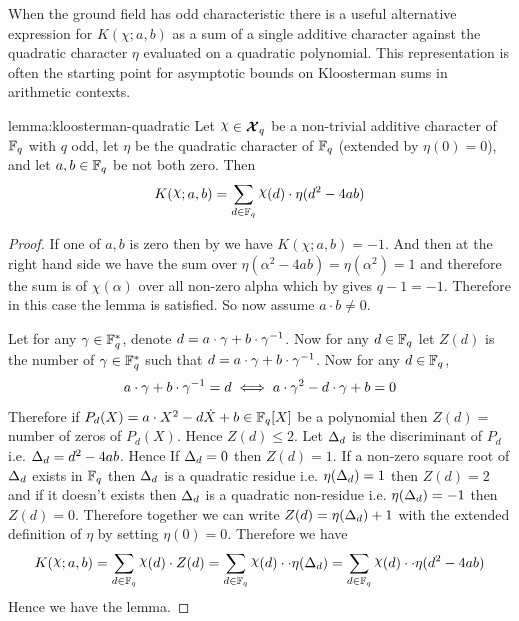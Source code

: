 When the ground field has odd characteristic there is a useful alternative expression for $K(\chi;a,b)$ as a sum of a single additive character against the quadratic character $\eta$ evaluated on a quadratic polynomial. This representation is often the starting point for asymptotic bounds on Kloosterman sums in arithmetic contexts.
\begin{lemma}{}{lemma:kloosterman-quadratic}
  Let $\chi\in\Xq$ be a non-trivial additive character of $\mathbb{F}_q$ with $q$ odd, let $\eta$ be the quadratic character of $\mathbb{F}_q$ (extended by $\eta(0)=0$), and let $a,b\in\mathbb{F}_q$ be not both zero. Then $$K(\chi;a,b)=\sum_{d\in\bbF_q}\chi(d)\cdot \eta(d^2-4ab)$$
\end{lemma}
\begin{proof}
  If one of $a,b$ is zero then by  we have $K(\chi;a,b)=-1$. And then at the right hand side we have the sum over $\eta(\alpha^2-4ab)=\eta(\alpha^2)=1$ and therefore the sum is of $\chi(\alpha)$ over all non-zero alpha which by \AddCharPropsthm[(i)] gives $q-1=-1$. Therefore in this case the lemma is satisfied. So now assume $a\cdot b\neq 0$. 

  Let for any $\gamma\in\mathbb{F}_q^*$, denote $d=a\cdot \gamma+b\cdot \gamma^{-1}$. Now for any $d\in\mathbb{F}_q$ let $Z(d)$ is the number of $\gamma\in\mathbb{F}_q^*$ such that $d=a\cdot \gamma+b\cdot \gamma^{-1}$. Now for any $d\in\mathbb{F}_q$, $$a\cdot \gamma+b\cdot \gamma^{-1}=d\iff a\cdot \gamma^2-d\cdot \gamma+b=0$$Therefore if $P_d(X)=a\cdot X^2-d\dot X+b\in\mathbb{F}_q[X]$ be a polynomial then $Z(d)=$ number of zeros of $P_d(X)$. Hence $Z(d)\leq 2$. Let $\Delta_d$ is the discriminant of $P_d$ i.e. $\Delta_d=d^2-4ab$. Hence If $\Delta_d=0$ then $Z(d)=1$. If a non-zero square root of $\Delta_d$ exists in $\mathbb{F}_q$ then $\Delta_d$ is a quadratic residue i.e. $\eta(\Delta_d)=1$ then $Z(d)=2$ and if it doesn't exists then $\Delta_d$ is a quadratic non-residue i.e. $\eta(\Delta_d)=-1$ then $Z(d)=0$. Therefore together we can write $Z(d)=\eta(\Delta_d)+1$ with the extended definition of $\eta$ by setting $\eta(0)=0$. Therefore we have  $$K(\chi;a,b)=\sum_{d\in\bbF_q}\chi(d)\cdot Z(d)=\sum_{d\in\bbF_q}\chi(d)\cdot\cdot \eta(\Dl_d)=\sum_{d\in\bbF_q}\chi(d)\cdot\cdot \eta(d^2-4ab)$$Hence we have the lemma.
\end{proof}

